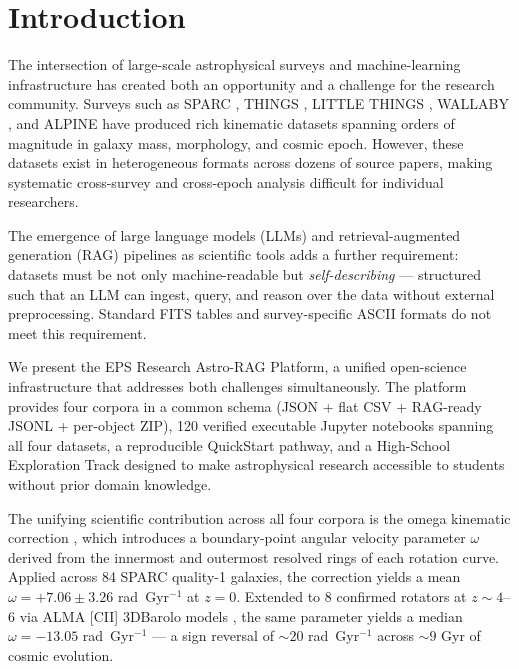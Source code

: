 \documentclass[twocolumn]{aastex631}
\begin{document}
\section{Introduction}
\label{sec:intro}

The intersection of large-scale astrophysical surveys and machine-learning
infrastructure has created both an opportunity and a challenge for the research
community. Surveys such as SPARC \citep{lelli2016}, THINGS \citep{walter2008},
LITTLE THINGS \citep{oh2015}, WALLABY \citep{koribalski2020}, and ALPINE
\citep{lefevre2020} have produced rich kinematic datasets spanning orders of
magnitude in galaxy mass, morphology, and cosmic epoch. However, these datasets
exist in heterogeneous formats across dozens of source papers, making systematic
cross-survey and cross-epoch analysis difficult for individual researchers.

The emergence of large language models (LLMs) and retrieval-augmented generation
(RAG) pipelines as scientific tools adds a further requirement: datasets must be
not only machine-readable but \emph{self-describing} --- structured such that an
LLM can ingest, query, and reason over the data without external preprocessing.
Standard FITS tables and survey-specific ASCII formats do not meet this
requirement.

We present the EPS Research Astro-RAG Platform, a unified open-science
infrastructure that addresses both challenges simultaneously. The platform
provides four corpora in a common schema (JSON + flat CSV + RAG-ready JSONL +
per-object ZIP), 120 verified executable Jupyter notebooks spanning all four
datasets, a reproducible QuickStart pathway, and a High-School Exploration
Track designed to make astrophysical research accessible to students without
prior domain knowledge.

The unifying scientific contribution across all four corpora is the omega
kinematic correction \citep{flynn2025}, which introduces a boundary-point
angular velocity parameter $\omega$ derived from the innermost and outermost
resolved rings of each rotation curve. Applied across 84 SPARC quality-1
galaxies, the correction yields a mean $\omega = +7.06 \pm 3.26$ rad~Gyr$^{-1}$
at $z = 0$. Extended to 8 confirmed rotators at $z \sim 4$--$6$ via ALMA
[CII] 3DBarolo models \citep{jones2021}, the same parameter yields a median
$\omega = -13.05$ rad~Gyr$^{-1}$ --- a sign reversal of $\sim 20$ rad~Gyr$^{-1}$
across $\sim 9$ Gyr of cosmic evolution.
\end{document}
